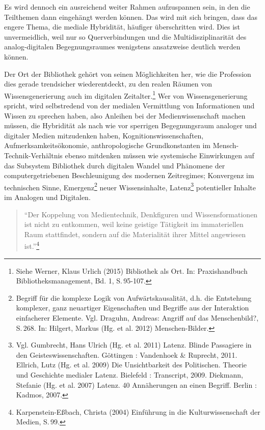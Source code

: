 \documentclass[a4paper,
fontsize=11pt,
oneside,
numbers=noperiodatend,
parskip=half-,
bibliography=totoc,
final
]{scrartcl}
\begin{document}
Es wird dennoch ein ausreichend weiter Rahmen aufzuspannen sein, in den
die Teilthemen dann eingehängt werden können. Das wird mit sich bringen,
dass das engere Thema, die mediale Hybridität, häufiger überschritten
wird. Dies ist unvermeidlich, weil nur so Querverbindungen und die
Multidisziplinarität des analog-digitalen Begegnungsraumes wenigstens
ansatzweise deutlich werden können.

Der Ort der Bibliothek gehört von seinen Möglichkeiten her, wie die
Profession dies gerade trendsicher wiederentdeckt, zu den realen Räumen
von Wissensgenerierung auch im digitalen Zeitalter.\footnote{Siehe
  Werner, Klaus Urlich (2015) Bibliothek als Ort. In: Praxishandbuch
  Bibliotheksmanagement, Bd. 1, S.\,95-107.} Wer von Wissensgenerierung
spricht, wird selbstredend von der medialen Vermittlung von
Informationen und Wissen zu sprechen haben, also Anleihen bei der
Medienwissenschaft machen müssen, die Hybridität als nach wie vor
sperrigen Begegnungsraum analoger und digitaler Medien mitzudenken
haben, Kognitionswissenschaften, Aufmerksamkeitsökonomie,
anthropologische Grundkonstanten im Mensch-Technik-Verhältnis ebenso
mitdenken müssen wie systemische Einwirkungen auf das Subsystem
Bibliothek durch digitalen Wandel und Phänomene der computergetriebenen
Beschleunigung des modernen Zeitregimes; Konvergenz im technischen
Sinne, Emergenz\footnote{Begriff für die komplexe Logik von
  Aufwärtskausalität, d.h. die Entstehung komplexer, ganz neuartiger
  Eigenschaften und Begriffe aus der Interaktion einfacherer Elemente.
  Vgl. Draguhn, Andreas: Angriff auf das Menschenbild?, S.\,268. In:
  Hilgert, Markus (Hg. et al. 2012) Menschen-Bilder.} neuer
Wissensinhalte, Latenz\footnote{Vgl. Gumbrecht, Hans Ulrich (Hg. et al.
  2011) Latenz. Blinde Passagiere in den Geisteswissenschaften.
  Göttingen : Vandenhoek \& Ruprecht, 2011. Ellrich, Lutz (Hg. et al.
  2009) Die Unsichtbarkeit des Politischen. Theorie und Geschichte
  medialer Latenz. Bielefeld : Transcript, 2009. Diekmann, Stefanie (Hg.
  et al. 2007) Latenz. 40 Annäherungen an einen Begriff. Berlin :
  Kadmos, 2007.} potentieller Inhalte im Analogen und Digitalen.

\begin{quote}
\enquote{Der Koppelung von Medientechnik, Denkfiguren und
Wissensformationen ist nicht zu entkommen, weil keine geistige Tätigkeit
im immateriellen Raum stattfindet, sondern auf die Materialität ihrer
Mittel angewiesen ist.}\footnote{Karpenstein-Eßbach, Christa (2004)
  Einführung in die Kulturwissenschaft der Medien, S.\,99.}
\end{quote}
\end{document}
